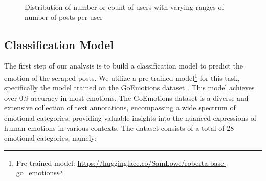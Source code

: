 \documentclass[conference,compsoc]{IEEEtran}
\begin{document}
\begin{figure}[h]
\centering
{}
\hfill
{}
\hfill
{}
\caption{Distribution of number or count of users with varying ranges of number of posts per user}
\label{fig:user_postcount_distribution}
\end{figure}

\subsection{Classification Model}
The first step of our analysis is to build a classification model to predict the emotion of the scraped posts. We utilize a pre-trained model\footnote{Pre-trained model: \url{https://huggingface.co/SamLowe/roberta-base-go_emotions}} for this task, specifically the model trained on the GoEmotions dataset \citep{Demszky+20:GoEmotions}. This model achieves over 0.9 accuracy in most emotions. The GoEmotions dataset is a diverse and extensive collection of text annotations, encompassing a wide spectrum of emotional categories, providing valuable insights into the nuanced expressions of human emotions in various contexts. The dataset consists of a total of 28 emotional categories, namely:
\end{document}
